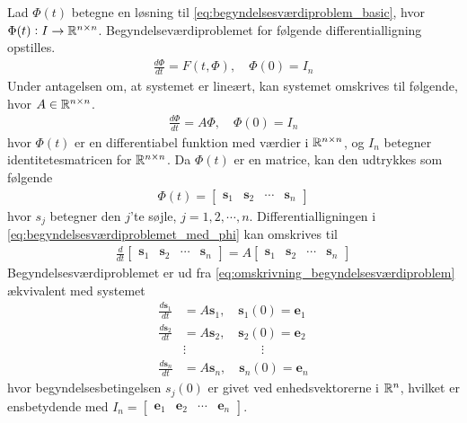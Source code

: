 Lad $\Phi(t)$ betegne en løsning til \eqref{eq:begyndelsesværdiproblem_basic}, hvor $\Phi(t): I\to \mathbb{R}^{n \times n}$. Begyndelseværdiproblemet for følgende differentialligning opstilles.
%
\begin{align*}
    \frac{d\Phi}{dt}= F(t,\Phi), \quad \Phi(0)=I_n
\end{align*}
%
Under antagelsen om, at systemet er lineært, 
kan systemet omskrives til følgende, hvor $A \in \mathbb{R}^{n \times n}$.
%
%
\begin{align}\label{eq:begyndelsesværdiproblemet_med_phi}
  \frac{d\Phi}{dt}=A\Phi, \quad \Phi(0)=I_n
\end{align}
%
hvor $\Phi(t)$ er en differentiabel funktion med værdier i $\mathbb{R}^{n \times n}$, og $I_n$ betegner identitetesmatricen for $\mathbb{R}^{n\times n}$. Da $\Phi(t)$ er en matrice, kan den udtrykkes som følgende
\begin{align*}
    \Phi(t)=\begin{bmatrix}\mathbf{s}_1 & \mathbf{s}_2 & \cdots & \mathbf{s}_n\end{bmatrix}
\end{align*}
%
hvor $s_j$ betegner den $j$'te søjle, $j=1, 2, \cdots, n$. Differentialligningen i \eqref{eq:begyndelsesværdiproblemet_med_phi} kan omskrives til
\begin{align}
    \frac{d}{dt}\begin{bmatrix}\mathbf{s}_1 & \mathbf{s}_2 & \cdots & \mathbf{s}_n\end{bmatrix}=A\begin{bmatrix}\mathbf{s}_1 & \mathbf{s}_2 & \cdots & \mathbf{s}_n\end{bmatrix} \label{eq:omskrivning_begyndelsesværdiproblem}
\end{align}
%
Begyndelsesværdiproblemet er ud fra \eqref{eq:omskrivning_begyndelsesværdiproblem} ækvivalent med systemet
\begin{align*}
    \frac{d \mathbf{s}_1}{dt}&=A\mathbf{s}_1, \quad \mathbf{s}_1(0)=\mathbf{e}_1\\
    \frac{d \mathbf{s}_2}{dt}&=A\mathbf{s}_2, \quad \mathbf{s}_2(0)=\mathbf{e}_2\\
    &\vdots \quad\quad\quad\quad\quad\quad \vdots\\
    \frac{d \mathbf{s}_n}{dt}&=A\mathbf{s}_n, \quad \mathbf{s}_n(0)=\mathbf{e}_n
\end{align*}
%
hvor begyndelsesbetingelsen $s_j(0)$ er givet ved enhedsvektorerne i $\mathbb{R}^n$, hvilket er ensbetydende med $I_{n}=\begin{bmatrix}\textbf{e}_1 & \textbf{e}_2 & \cdots & \textbf{e}_n\end{bmatrix}$.

